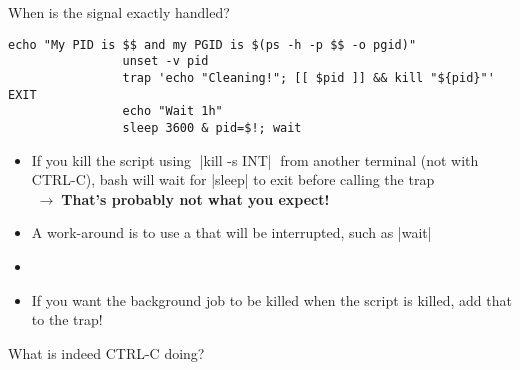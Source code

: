 \begin{frame}[fragile]{When is the signal exactly handled?}
\begin{overlayarea}{\textwidth}{0.33\textheight}
\begin{onlyenv}
\begin{lstlisting}[style=MyBash]
                echo "My PID is $$ and my PGID is $(ps -h -p $$ -o pgid)"
                unset -v pid
                trap 'echo "Cleaning!"; [[ $pid ]] && kill "${pid}"' EXIT
                echo "Wait 1h"
                sleep 3600 & pid=$!; wait
            \end{lstlisting}
        \end{onlyenv}
    \end{overlayarea}
    \begin{itemize}
        \item If you kill the script using $\;$\bash|kill -s INT|$\;$ from another terminal (not with CTRL-C), bash will wait for \bash|sleep| to exit before calling the trap\\
              $\;\to\;$\alert{\textbf{That's probably not what you expect!}}
        \item<2-> A work-around is to use a  that will be interrupted, such as \bash|wait|
        \item<2-> 
        \item<3-> If you want the background job to be killed when the script is killed, add that to the trap!
    \end{itemize}
\end{frame}
\begin{frame}{What is indeed CTRL-C doing?}
    
\end{frame}











